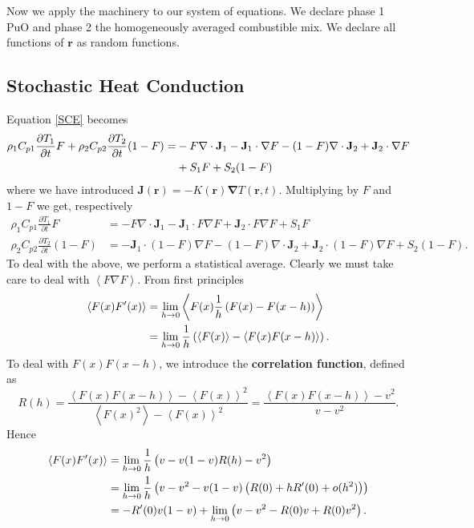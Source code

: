 \documentclass[12pt]{article}
\begin{document}
Now we apply the machinery to our system of equations. We declare phase 1 PuO and phase 2 the homogeneously averaged combustible mix. We declare all functions of $\mathbf{r}$ as random functions. 

\subsection{Stochastic Heat Conduction}
Equation \ref{SCE} becomes
\begin{align}
    \rho_1 C_{p1} \frac{\partial T_1}{\partial t}F +\rho_2 C_{p2} \frac{\partial T_2}{\partial t}(1-F)=&-F \mathbf{\nabla} \cdot \mathbf{J}_1 - \mathbf{J}_1 \cdot \mathbf{\nabla}F -(1-F) \mathbf{\nabla} \cdot \mathbf{J}_2 +\mathbf{J}_2 \cdot \mathbf{\nabla}F \notag \\ &+S_1 F + S_2 (1-F)
\end{align}
where we have introduced $\mathbf{J}(\mathbf{r})=-K(\mathbf{r})\mathbf{\nabla}T(\mathbf{r},t)$. Multiplying by $F$ and $1-F$ we get, respectively 
\begin{align}
    \rho_1 C_{p1}\frac{\partial T_1}{\partial t}F&=-F\nabla \cdot \mathbf{J}_1-\mathbf{J}_1 \cdot F\nabla F+\mathbf{J}_2 \cdot F\nabla F + S_1 F \\
    \rho_2 C_{p2}\frac{\partial T_2}{\partial t}(1-F)&=-\mathbf{J}_1 \cdot (1-F)\nabla F-(1-F)\nabla \cdot \mathbf{J}_2+\mathbf{J}_2 \cdot (1-F)\nabla F + S_2 (1-F).
\end{align}
To deal with the above, we perform a statistical average. Clearly we must take care to deal with $\left< F\nabla F \right>$. From first principles 
\begin{align}
    \left< F(x) F'(x)\right>&=\lim _{h\rightarrow 0}\left< F(x) \frac{1}{h} \left(F(x)-F(x-h)\right)\right> \notag \\
    &=\lim_{h\rightarrow 0} \frac{1}{h}\left( \left< F(x)\right>-\left< F(x)F(x-h)\right> \right).
\end{align}
To deal with $F(x)F(x-h)$, we introduce the \textbf{correlation function}, defined as 
\begin{equation}
    R(h)=\frac{\left< F(x)F(x-h)\right>-\left< F(x)\right>^2}{\left< F(x)^2\right>-\left< F(x)\right>^2}=\frac{\left< F(x)F(x-h)\right>-v^2}{v-v^2}.
\end{equation}
Hence 
\begin{align}
    \left< F(x)F'(x)\right>&=\lim_{h\rightarrow 0} \frac{1}{h}\left(v-v(1-v)R(h)-v^2\right) \notag \\
    &=\lim_{h\rightarrow 0} \frac{1}{h} \left( v-v^2-v(1-v)\left(R(0)+hR'(0)+o(h^2)\right)\right) \notag \\ 
    &=-R'(0)v(1-v) +\lim_{h\rightarrow 0}\left( v-v^2-R(0)v +R(0)v^2\right).
\end{align}
\end{document}
